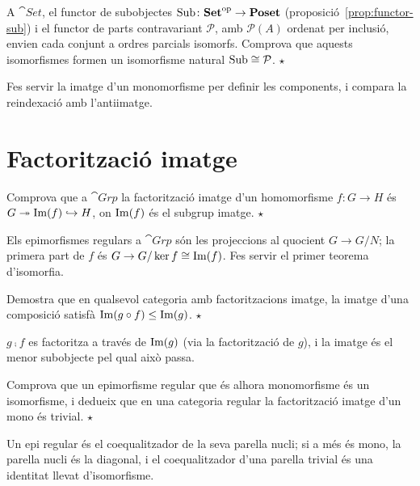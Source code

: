 \begin{exercici}
A $\cat{Set}$, el functor de subobjectes $\operatorname{Sub}\colon\mathbf{Set}^{\mathrm{op}}\to\mathbf{Poset}$ (proposició~\ref{prop:functor-sub}) i el functor de parts contravariant $\mathcal P$, amb $\mathcal P(A)$ ordenat per inclusió, envien cada conjunt a ordres parcials isomorfs. Comprova que aquests isomorfismes formen un isomorfisme natural $\operatorname{Sub}\cong\mathcal P$. \hfill{\normalfont$\star$}
\begin{indicacio}
Fes servir la imatge d'un monomorfisme per definir les components, i compara la reindexació amb l'antiimatge.
\end{indicacio}
\end{exercici}


\section{Factorització imatge}

\begin{exercici}
Comprova que a $\cat{Grp}$ la factorització imatge d'un homomorfisme $f\colon G\to H$ és $G\twoheadrightarrow \operatorname{Im}(f)\hookrightarrow H$, on $\operatorname{Im}(f)$ és el subgrup imatge. \hfill{\normalfont$\star$}
\begin{indicacio}
Els epimorfismes regulars a $\cat{Grp}$ són les projeccions al quocient $G\to G/N$; la primera part de $f$ és $G\to G/\ker f\cong\operatorname{Im}(f)$. Fes servir el primer teorema d'isomorfia.
\end{indicacio}
\end{exercici}

\begin{exercici}
Demostra que en qualsevol categoria amb factoritzacions imatge, la imatge d'una composició satisfà $\operatorname{Im}(g\circ f)\leq\operatorname{Im}(g)$. \hfill{\normalfont$\star$}
\begin{indicacio}
$g\comp f$ es factoritza a través de $\operatorname{Im}(g)$ (via la factorització de $g$), i la imatge és el menor subobjecte pel qual això passa.
\end{indicacio}
\end{exercici}

\begin{exercici}
Comprova que un epimorfisme regular que és alhora monomorfisme és un isomorfisme, i dedueix que en una categoria regular la factorització imatge d'un mono és trivial. \hfill{\normalfont$\star$}
\begin{indicacio}
Un epi regular és el coequalitzador de la seva parella nucli; si a més és mono, la parella nucli és la diagonal, i el coequalitzador d'una parella trivial és una identitat llevat d'isomorfisme.
\end{indicacio}
\end{exercici}

